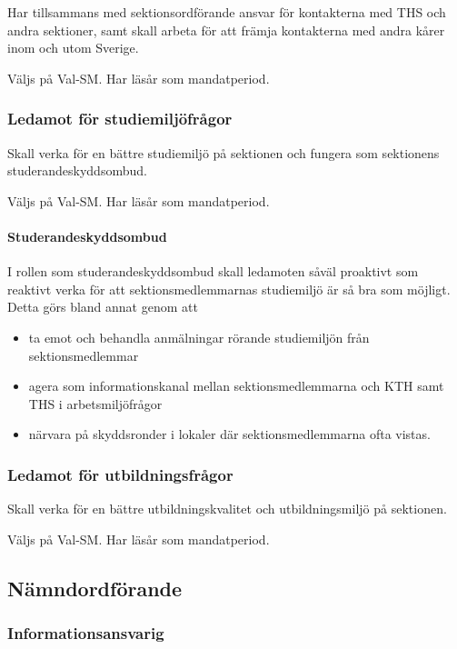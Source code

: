 \documentclass{dgovdoc}
\begin{document}
Har tillsammans med sektionsordförande ansvar för kontakterna med THS och andra
sektioner, samt skall arbeta för att främja kontakterna med andra kårer inom
och utom Sverige.

Väljs på Val-SM. Har läsår som mandatperiod.

\subsubsection{Ledamot för studiemiljöfrågor}

Skall verka för en bättre studiemiljö på sektionen och fungera som sektionens
studerandeskyddsombud.

Väljs på Val-SM. Har läsår som mandatperiod.

\paragraph{Studerandeskyddsombud}

I rollen som studerandeskyddsombud skall ledamoten såväl proaktivt som reaktivt
verka för att sektionsmedlemmarnas studiemiljö är så bra som möjligt. Detta
görs bland annat genom att

\begin{itemize}
  \item ta emot och behandla anmälningar rörande studiemiljön från
    sektionsmedlemmar
  \item agera som informationskanal mellan sektionsmedlemmarna och KTH samt THS
    i arbetsmiljöfrågor
  \item närvara på skyddsronder i lokaler där sektionsmedlemmarna ofta vistas.
\end{itemize}

\subsubsection{Ledamot för utbildningsfrågor}

Skall verka för en bättre utbildningskvalitet och utbildningsmiljö på
sektionen.

Väljs på Val-SM. Har läsår som mandatperiod.

\subsection{Nämndordförande}

\subsubsection{Informationsansvarig}
\end{document}
